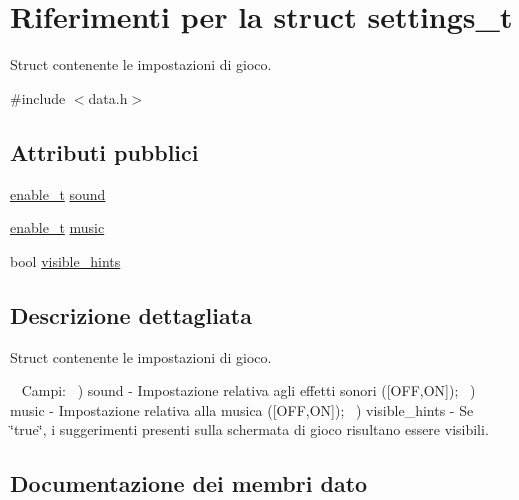 \hypertarget{structsettings__t}{}\section{Riferimenti per la struct settings\+\_\+t}
\label{structsettings__t}


Struct contenente le impostazioni di gioco.  




{\ttfamily \#include $<$data.\+h$>$}

\subsection*{Attributi pubblici}
\begin{DoxyCompactItemize}
\item 
\hyperlink{data_8h_a56839c56ca6deb3cff5e21540ddb8218}{enable\+\_\+t} \hyperlink{structsettings__t_a2aa1ff1ddeee8e7ac3d1e544af1c2d67}{sound}
\item 
\hyperlink{data_8h_a56839c56ca6deb3cff5e21540ddb8218}{enable\+\_\+t} \hyperlink{structsettings__t_a4b0508385c16a4e5aeb4bf8b8f5cf6fe}{music}
\item 
bool \hyperlink{structsettings__t_a824c2f3df8afc1c1823769065bd6eeb3}{visible\+\_\+hints}
\end{DoxyCompactItemize}


\subsection{Descrizione dettagliata}
Struct contenente le impostazioni di gioco. 

~\newline
Campi\+: ~) sound -\/ Impostazione relativa agli effetti sonori (\mbox{[}O\+FF,ON\mbox{]}); ~) music -\/ Impostazione relativa alla musica (\mbox{[}O\+FF,ON\mbox{]}); ~) visible\+\_\+hints -\/ Se \char`\"{}true\char`\"{}, i suggerimenti presenti sulla schermata di gioco risultano essere visibili. 

\subsection{Documentazione dei membri dato}
\mbox{\label{structsettings__t_a4b0508385c16a4e5aeb4bf8b8f5cf6fe}} 
